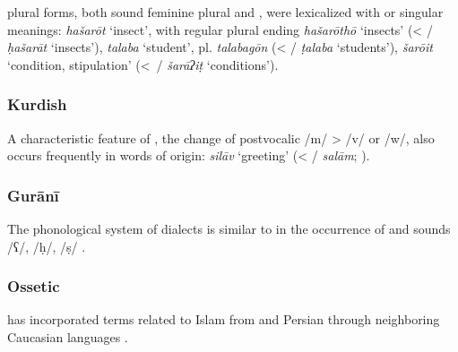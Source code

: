 \documentclass[output=paper]{langsci/langscibook}
\begin{document}
 plural forms, both sound feminine plural and , were lexicalized with  or singular meanings: \textit{hašarōt} ‘insect’, with regular plural ending \textit{hašarōthō} ‘insects’ (< / \textit{ḥašarāt} ‘insects’), \textit{talaba} ‘student’, pl. \textit{talabagōn} (< / \textit{ṭalaba} ‘students’), \textit{šarōit} ‘condition, stipulation’ (<~\slash{} \textit{šarāʔiṭ} ‘conditions’).


\subsubsection{Kurdish}

A characteristic feature of , the change of postvocalic /m/ > /v/ or /w/, also occurs frequently in words of  origin: \textit{silāv} ‘greeting’ (< / \textit{salām}; \citealt{Paul2008}).

\subsubsection{Gurānī}

The phonological system of  dialects is similar to  in the occurrence of   and  sounds /ʕ/, /ḥ/, /ṣ/ \citep{MacKenzie2012}.

\subsubsection{Ossetic}
 has incorporated terms related to Islam from  and Persian through neighboring Caucasian languages \citep{Thordarson2009}.
\end{document}
